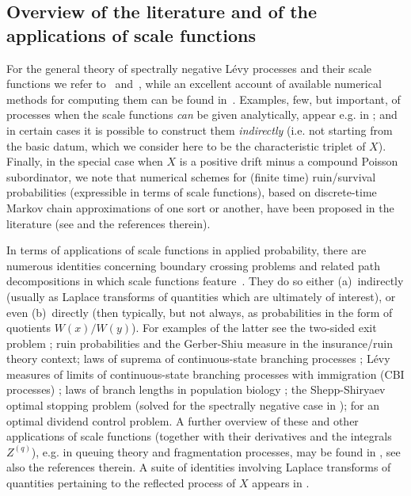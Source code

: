 \documentclass[pdftex,oneside,11pt,reqno]{amsart}
\theoremstyle{definition}
\theoremstyle{theorem}
\theoremstyle{remark}
\numberwithin{equation}{section}
\numberwithin{definition}{section}
\begin{document}
\subsection{Overview of the literature and of the applications of scale functions}\label{subsections:scales:applications}
For the general theory of spectrally negative L\'evy processes and their scale functions we refer to~\cite[Chapter~8]{kyprianou} and~\cite[Chapter~VII]{bertoin}, while an excellent account of available numerical methods for computing them can be found in~\cite[Chapter~5]{kuznetsovkyprianourivero}. 
Examples, few, but important, of processes when the scale functions 
\emph{can} be given analytically, appear e.g. in \cite{hubalek}; and in certain cases it is 
possible to construct them \emph{indirectly} \cite[Chapter~4]{kuznetsovkyprianourivero} (i.e. not starting from the basic datum, which we consider here to be the characteristic triplet of 
$X$). Finally, in the special case when $X$ is a positive drift minus a compound Poisson subordinator, we note that numerical schemes for (finite time) ruin/survival probabilities (expressible in terms of scale functions), based on discrete-time Markov chain approximations of one sort or another, have been proposed in the literature (see \cite{vylder,dickson,cardoso,dicksongray} and the references therein).

In terms of applications of scale functions in applied probability, there are numerous identities concerning
boundary crossing problems and related path decompositions in which scale
functions feature~\cite[p.~100]{kuznetsovkyprianourivero}. They do so either (a)~indirectly (usually as Laplace transforms of quantities which are ultimately of
interest), or even (b)~directly (then typically, but not always, as probabilities in the form of quotients ${W}(x)/{W}(y)$). For examples of the latter see the two-sided exit problem \cite[Chapter VII, Theorem 8]{bertoin}; ruin probabilities \cite[p. 217, Eq.~(8.15)]{kyprianou} and the Gerber-Shiu measure \cite[Section~5.4]{gerber_shiu} in the insurance/ruin theory context; laws of suprema of continuous-state branching processes \cite[Proposition~3.1]{bingham_branching}; L\'evy measures of limits of continuous-state branching processes with immigration (CBI processes) \cite[Eq.~(3.7)]{keller_mijatovic}; laws of branch lengths in population biology \cite[Eq.~(7)]{lambert}; the Shepp-Shiryaev optimal stopping problem (solved for the spectrally negative case in \cite[Theorem~2, Eq.~(30)]{avram_exitproblems}); \cite[Proposition~1]{loeffen} for an optimal dividend control problem. A further overview of these and other applications of scale functions (together with their derivatives and the integrals ${Z^{(q)}}$), e.g. in queuing theory and fragmentation processes, may be found in \cite[Section 1.2]{kuznetsovkyprianourivero}, see also the references therein. A suite of identities involving Laplace transforms of quantities pertaining to the reflected process of $X$ appears in \cite{mijatovicpistorius}.
\end{document}
